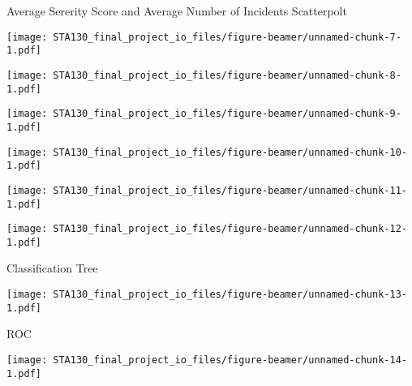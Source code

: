 \documentclass[ignorenonframetext,]{beamer}
\begin{document}
\begin{frame}{Average Sererity Score and Average Number of Incidents
Scatterpolt}

\texttt{[image: STA130\_final\_project\_io\_files/figure-beamer/unnamed-chunk-7-1.pdf]}

\end{frame}

\begin{frame}

\texttt{[image: STA130\_final\_project\_io\_files/figure-beamer/unnamed-chunk-8-1.pdf]}

\end{frame}

\begin{frame}

\texttt{[image: STA130\_final\_project\_io\_files/figure-beamer/unnamed-chunk-9-1.pdf]}

\end{frame}

\begin{frame}

\texttt{[image: STA130\_final\_project\_io\_files/figure-beamer/unnamed-chunk-10-1.pdf]}

\end{frame}

\begin{frame}

\texttt{[image: STA130\_final\_project\_io\_files/figure-beamer/unnamed-chunk-11-1.pdf]}

\end{frame}

\begin{frame}

\texttt{[image: STA130\_final\_project\_io\_files/figure-beamer/unnamed-chunk-12-1.pdf]}

\end{frame}

\begin{frame}{Classification Tree}

\texttt{[image: STA130\_final\_project\_io\_files/figure-beamer/unnamed-chunk-13-1.pdf]}

\end{frame}

\begin{frame}{ROC}

\texttt{[image: STA130\_final\_project\_io\_files/figure-beamer/unnamed-chunk-14-1.pdf]}

\end{frame}
\end{document}
